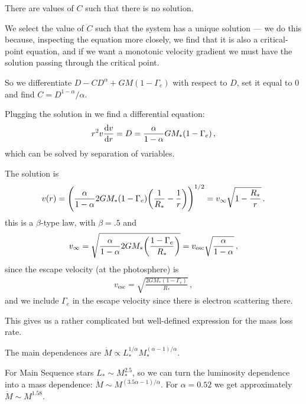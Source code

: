 \documentclass[main.tex]{subfiles}
\begin{document}
There are values of \(C\) such that there is no solution. 

We select the value of \(C\) such that the system has a unique solution --- we do this because, inspecting the equation more closely, we find that it is also a critical-point equation, and if we want a monotonic velocity gradient we must have the solution passing through the critical point.


So we differentiate \(D - C D^{\alpha } + GM (1-\Gamma_{e})\) with respect to \(D\), set it equal to \(0\) and find \(C = D^{1-\alpha } / \alpha \).

Plugging the solution in we find a differential equation: 
%
\begin{align}
  r^2 v \dv{v}{r} = D = \frac{\alpha }{1 - \alpha } GM_{*} (1-\Gamma_{e})
\,,
\end{align}
%
which can be solved by separation of variables.

The solution is 
%
\begin{align}
  v(r) = \qty(\frac{\alpha }{1-\alpha } 2GM_{*} \qty(1-\Gamma_{e} ) \qty(\frac{1}{R_{*}} - \frac{1}{r}))^{1/2}
  = v_{ \infty } \sqrt{1 - \frac{R_{*}}{r}}
\,. 
\end{align}
%
this is a \(\beta \)-type law, with \(\beta = \num{.5}\) and 
%
\begin{align}
  v_{ \infty } = \sqrt{\frac{\alpha }{1-\alpha } 2GM_{*} \qty(\frac{1-\Gamma_{e} }{R_{*}})}
  = v _{\text{esc}} \sqrt{\frac{\alpha }{1 - \alpha }}
\,,
\end{align}
%
since the escape velocity (at the photosphere) is 
%
\begin{align}
  v _{\text{esc}} = \sqrt{\frac{2 G M_{*} (1 - \Gamma_{e })}{R_{*}}}
\,,
\end{align}
%
and we include \(\Gamma_{e} \) in the escape velocity since there is electron scattering there.

This gives us a rather complicated but well-defined expression for the mass loss rate. 

The main dependences are \(\dot{M} \propto L_{*}^{ 1/ \alpha } M_{*}^{(\alpha - 1 ) / \alpha }\).


For Main Sequence stars \(L_{*} \sim M_{*}^{2.5}\), so we can turn the luminosity dependence into a mass dependence: \(\dot{M} \sim M^{(3.5 \alpha  - 1 ) / \alpha }\).
For \(\alpha = 0.52\) we get approximately \(\dot{M} \sim M^{1.58}\).
\end{document}
